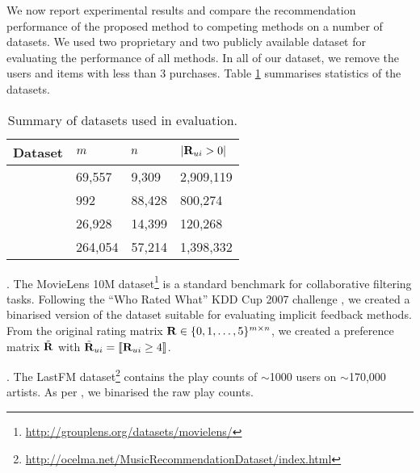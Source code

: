 We now report experimental results and compare the recommendation performance of the proposed method to competing methods on a number of datasets. We used two proprietary and two publicly available dataset for evaluating the performance of all methods. In all of our dataset, we remove the users and items with less than 3 purchases.  Table \ref{tbl:datasets} summarises statistics of the datasets.

\begin{table}
	\centering
	\caption{Summary of datasets used in evaluation.}
	\label{tbl:datasets}
	
	\begin{tabular}{llll}
	\toprule
	\toprule	
	\textbf{Dataset} & $m$ & $n$ & $ | \mathbf{R}_{ui} > 0 | $ \\
	\toprule
	\MLens  & 69,557 & 9,309 & 2,909,119 \\
	\LastFM & 992 & 88,428 & 800,274\\
	\Guitar & 26,928 & 14,399 & 120,268 \\
	\Lowes & 264,054 & 57,214 & 1,398,332 \\
	\bottomrule
	\end{tabular}
\end{table}

\MLens. The MovieLens 10M dataset\footnote{\scriptsize \url{http://grouplens.org/datasets/movielens/}} is a standard benchmark for collaborative filtering tasks.
Following the ``Who Rated What'' KDD Cup 2007 challenge \citep{Bennett:2007}, we created a binarised version of the dataset suitable for evaluating implicit feedback methods.
From the original rating matrix $\mathbf{R} \in \{ 0, 1, \ldots, 5 \}^{m \times n}$, we created a preference matrix $\tilde{\mathbf{R}}$ with $\tilde{\mathbf{R}}_{ui} = \llbracket \mathbf{R}_{ui} \geq 4 \rrbracket$.

\LastFM. The LastFM dataset\footnote{{\scriptsize \url{http://ocelma.net/MusicRecommendationDataset/index.html}}} \citep{Celma:2008} contains the play counts of $\sim$1000 users on $\sim$170,000 artists. As per \MLens, we binarised the raw play counts.





